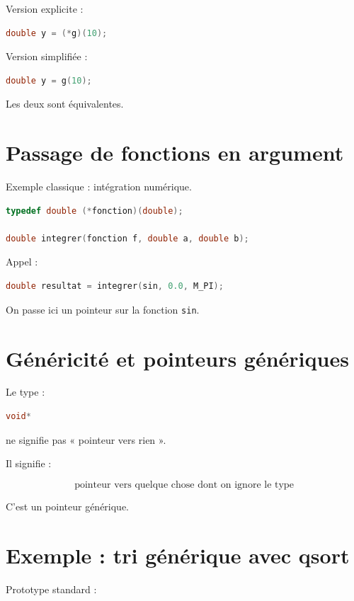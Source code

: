 Version explicite :

\begin{lstlisting}[language=C]
double y = (*g)(10);
\end{lstlisting}

Version simplifiée :

\begin{lstlisting}[language=C]
double y = g(10);
\end{lstlisting}

Les deux sont équivalentes.

\section{Passage de fonctions en argument}

Exemple classique : intégration numérique.

\begin{lstlisting}[language=C]
typedef double (*fonction)(double);

double integrer(fonction f, double a, double b);
\end{lstlisting}

Appel :

\begin{lstlisting}[language=C]
double resultat = integrer(sin, 0.0, M_PI);
\end{lstlisting}

On passe ici un pointeur sur la fonction \texttt{sin}.

\section{Généricité et pointeurs génériques}

Le type :

\begin{lstlisting}[language=C]
void*
\end{lstlisting}

ne signifie pas « pointeur vers rien ».

Il signifie :

\[
\boxed{\text{pointeur vers quelque chose dont on ignore le type}}
\]

C’est un pointeur générique.

\section{Exemple : tri générique avec qsort}

Prototype standard :

